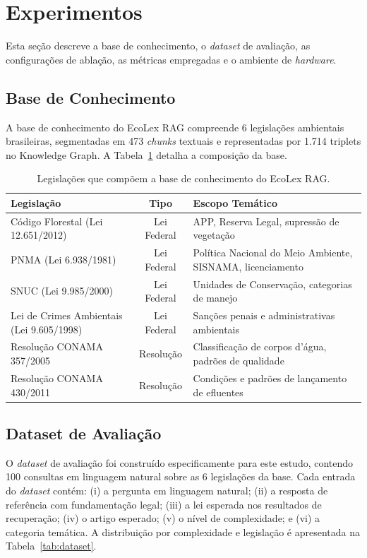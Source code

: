 \documentclass[12pt]{article}
\begin{document}
\section{Experimentos}

Esta seção descreve a base de conhecimento, o \textit{dataset} de avaliação, as configurações de ablação, as métricas empregadas e o ambiente de \textit{hardware}.

\subsection{Base de Conhecimento}

A base de conhecimento do EcoLex RAG compreende 6 legislações ambientais brasileiras, segmentadas em 473 \textit{chunks} textuais e representadas por 1.714 triplets no Knowledge Graph. A Tabela~\ref{tab:legislações} detalha a composição da base.

\begin{table}[ht]
\centering
\caption{Legislações que compõem a base de conhecimento do EcoLex RAG.}
\label{tab:legislações}
\begin{tabular}{lcp{5cm}}
\toprule
\textbf{Legislação} & \textbf{Tipo} & \textbf{Escopo Temático} \\
\midrule
Código Florestal (Lei 12.651/2012) & Lei Federal & APP, Reserva Legal, supressão de vegetação \\
PNMA (Lei 6.938/1981) & Lei Federal & Política Nacional do Meio Ambiente, SISNAMA, licenciamento \\
SNUC (Lei 9.985/2000) & Lei Federal & Unidades de Conservação, categorias de manejo \\
Lei de Crimes Ambientais (Lei 9.605/1998) & Lei Federal & Sanções penais e administrativas ambientais \\
Resolução CONAMA 357/2005 & Resolução & Classificação de corpos d'água, padrões de qualidade \\
Resolução CONAMA 430/2011 & Resolução & Condições e padrões de lançamento de efluentes \\
\bottomrule
\end{tabular}
\end{table}

\subsection{Dataset de Avaliação}

O \textit{dataset} de avaliação foi construído especificamente para este estudo, contendo 100 consultas em linguagem natural sobre as 6 legislações da base. Cada entrada do \textit{dataset} contém: (i) a pergunta em linguagem natural; (ii) a resposta de referência com fundamentação legal; (iii) a lei esperada nos resultados de recuperação; (iv) o artigo esperado; (v) o nível de complexidade; e (vi) a categoria temática. A distribuição por complexidade e legislação é apresentada na Tabela~\ref{tab:dataset}.
\end{document}
